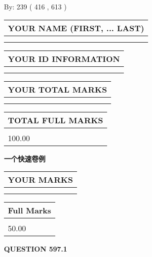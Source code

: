 \documentclass{ctexart}
\begin{document}
   
\hspace{1.0in} By: 
 239 ( 416 ,  613 )
   
   
   
   
\newpage 
\setcounter{page}{ 
   597001 } 
   
   
   
   
\noindent\begin{tabular}{|l|}
\hline
YOUR NAME (FIRST, ... LAST)  \\
\hline
 \\ 
 \\ 
\hline
\end{tabular}
\hspace{0.05in} \begin{tabular}{|l|}
\hline
 YOUR   ID   INFORMATION  \\
\hline
 \\ 
 \\ 
\hline
\end{tabular}
   
   
\vspace{0.2in}\noindent\begin{tabular}{|l|}
\hline
YOUR TOTAL MARKS  \\
\hline
 \\ 
 \\ 
\hline
\end{tabular}
\hspace{0.05in} \begin{tabular}{|l|}
\hline
TOTAL FULL MARKS  \\
\hline
 \\ 
100.00 \\
\hline
\end{tabular}
   
   
 \vspace{0.2in}
{\LARGE {\textbf{ 一个快速卷例}}}
   
   
  
\vspace{0.2in}
  
\noindent\begin{tabular}{|l|}
\hline
 YOUR MARKS  \\
\hline
 \\ 
 \\ 
\hline
\end{tabular}
\hspace{0.05in} \begin{tabular}{|l|}
\hline
 Full Marks  \\
\hline
 \\ 
50.00 \\
\hline
\end{tabular}
{\textbf{\Large{QUESTION
597.1 
}}}
  
\end{document}
